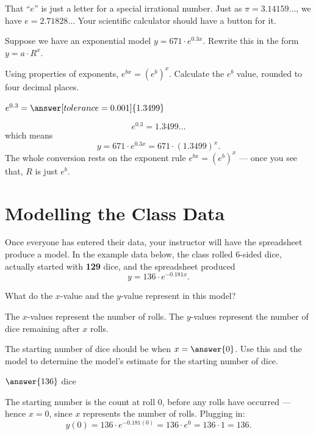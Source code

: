 \documentclass[12pt]{ximera}
\begin{document}
That ``$e$'' is just a letter for a special irrational number. Just as
$\pi = 3.14159\ldots$, we have $e = 2.71828\ldots$ Your scientific calculator should have
a button for it.

\begin{problem}
Suppose we have an exponential model $y = 671 \cdot e^{0.3x}$. Rewrite this in the form
$y = a \cdot R^x$.

Using properties of exponents, $e^{bx} = (e^b)^x$. Calculate the $e^b$ value, rounded to
four decimal places.

$e^{0.3} = \answer[tolerance=0.001]{1.3499}$

\begin{freeResponse}
\end{freeResponse}

\begin{solution}
\[
e^{0.3} = 1.3499\ldots
\]
which means
\[
y = 671 \cdot e^{0.3x} = 671 \cdot (1.3499)^x.
\]
The whole conversion rests on the exponent rule $e^{bx} = (e^b)^x$ --- once you see that,
$R$ is just $e^b$.
\end{solution}
\end{problem}

\section*{Modelling the Class Data}

Once everyone has entered their data, your instructor will have the spreadsheet produce a
model. In the example data below, the class rolled 6-sided dice, actually started with
\textbf{129} dice, and the spreadsheet produced
\[
y = 136 \cdot e^{-0.181x}.
\]

\begin{problem}
What do the $x$-value and the $y$-value represent in this model?

\begin{freeResponse}
\end{freeResponse}

\begin{solution}
The $x$-values represent the number of rolls. The $y$-values represent the number of dice
remaining after $x$ rolls.
\end{solution}
\end{problem}

\begin{problem}
The starting number of dice should be when $x = \answer{0}$. Use this and the model to
determine the model's estimate for the starting number of dice.

$\answer{136}$ dice

\begin{solution}
The starting number is the count at roll 0, before any rolls have occurred --- hence
$x = 0$, since $x$ represents the number of rolls. Plugging in:
\[
y(0) = 136 \cdot e^{-0.181(0)} = 136 \cdot e^{0} = 136 \cdot 1 = 136.
\]
\end{solution}
\end{problem}
\end{document}
